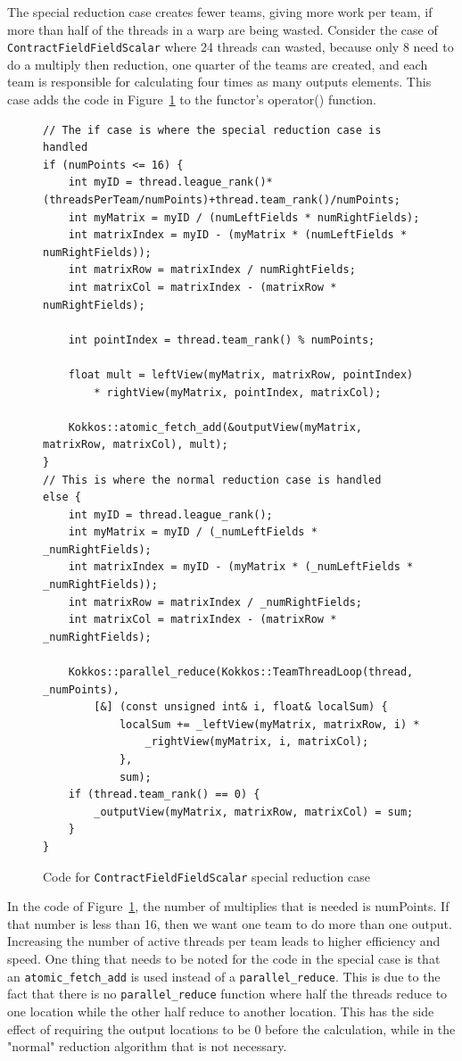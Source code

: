 The special reduction case creates fewer teams, giving more work per team, if
more than half of the threads in a warp are being wasted. Consider the
case of \texttt{ContractFieldFieldScalar} where 24 threads can wasted, because only 8
need to do a multiply then reduction, one quarter of the teams are created, and
each team is responsible for calculating four times as many outputs elements.
This case adds the code in
Figure~\ref{lst:ContractFieldFieldScalarReductionSpecialCase} to the functor's
operator() function.

\begin{figure}[!ht]
    \begin{lstlisting}
// The if case is where the special reduction case is handled
if (numPoints <= 16) {	
	int myID = thread.league_rank()*(threadsPerTeam/numPoints)+thread.team_rank()/numPoints;
	int myMatrix = myID / (numLeftFields * numRightFields);
	int matrixIndex = myID - (myMatrix * (numLeftFields * numRightFields));
	int matrixRow = matrixIndex / numRightFields;
	int matrixCol = matrixIndex - (matrixRow * numRightFields);

	int pointIndex = thread.team_rank() % numPoints;

	float mult = leftView(myMatrix, matrixRow, pointIndex) 
		* rightView(myMatrix, pointIndex, matrixCol);

	Kokkos::atomic_fetch_add(&outputView(myMatrix, matrixRow, matrixCol), mult);
}
// This is where the normal reduction case is handled
else {
	int myID = thread.league_rank();
	int myMatrix = myID / (_numLeftFields * _numRightFields);
	int matrixIndex = myID - (myMatrix * (_numLeftFields * _numRightFields));
	int matrixRow = matrixIndex / _numRightFields;
	int matrixCol = matrixIndex - (matrixRow * _numRightFields);

	Kokkos::parallel_reduce(Kokkos::TeamThreadLoop(thread, _numPoints),
		[&] (const unsigned int& i, float& localSum) {
			localSum += _leftView(myMatrix, matrixRow, i) *
				_rightView(myMatrix, i, matrixCol);
			},
			sum);
	if (thread.team_rank() == 0) {
		_outputView(myMatrix, matrixRow, matrixCol) = sum;
	}
}
    \end{lstlisting}
\caption{Code for \texttt{ContractFieldFieldScalar} special reduction case
\label{lst:ContractFieldFieldScalarReductionSpecialCase}} 
\end{figure}

In the code of Figure~\ref{lst:ContractFieldFieldScalarReductionSpecialCase},
the number of multiplies that is needed is numPoints. If that number is less
than 16, then we want one team to do more than one output. Increasing the number
of active threads per team leads to higher efficiency and speed.  One thing that
needs to be noted for the code in the special case is that an
\texttt{atomic\_fetch\_add} is used instead of a \texttt{parallel\_reduce}. This
is due to the fact that there is no \texttt{parallel\_reduce} function where half
the threads reduce to one location while the other half reduce to another
location. This has the side effect of requiring the output locations to be 0
before the calculation, while in the "normal" reduction algorithm that is not
necessary. 

